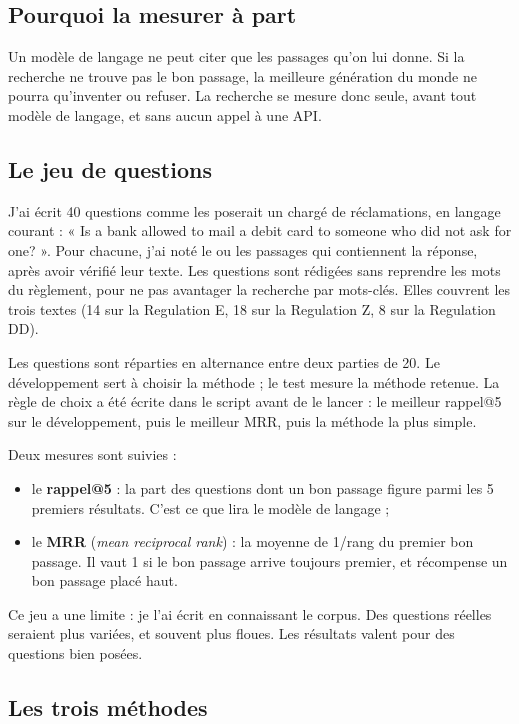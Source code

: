 \documentclass[11pt,a4paper]{article}
\begin{document}
\subsection{Pourquoi la mesurer à part}

Un modèle de langage ne peut citer que les passages qu'on lui donne. Si la recherche ne trouve pas le bon passage, la meilleure génération du monde ne pourra qu'inventer ou refuser. La recherche se mesure donc seule, avant tout modèle de langage, et sans aucun appel à une API.

\subsection{Le jeu de questions}

J'ai écrit 40 questions comme les poserait un chargé de réclamations, en langage courant : « Is a bank allowed to mail a debit card to someone who did not ask for one? ». Pour chacune, j'ai noté le ou les passages qui contiennent la réponse, après avoir vérifié leur texte. Les questions sont rédigées sans reprendre les mots du règlement, pour ne pas avantager la recherche par mots-clés. Elles couvrent les trois textes (14 sur la Regulation E, 18 sur la Regulation Z, 8 sur la Regulation DD).

Les questions sont réparties en alternance entre deux parties de 20. Le développement sert à choisir la méthode ; le test mesure la méthode retenue. La règle de choix a été écrite dans le script avant de le lancer : le meilleur rappel@5 sur le développement, puis le meilleur MRR, puis la méthode la plus simple.

Deux mesures sont suivies :
\begin{itemize}
  \item le \textbf{rappel@5} : la part des questions dont un bon passage figure parmi les 5 premiers résultats. C'est ce que lira le modèle de langage ;
  \item le \textbf{MRR} (\emph{mean reciprocal rank}) : la moyenne de 1/rang du premier bon passage. Il vaut 1 si le bon passage arrive toujours premier, et récompense un bon passage placé haut.
\end{itemize}

Ce jeu a une limite : je l'ai écrit en connaissant le corpus. Des questions réelles seraient plus variées, et souvent plus floues. Les résultats valent pour des questions bien posées.

\subsection{Les trois méthodes}
\end{document}

